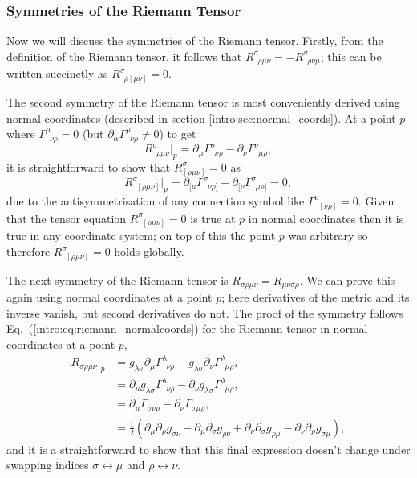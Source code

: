 \subsubsection{Symmetries of the Riemann Tensor}
Now we will discuss the symmetries of the Riemann tensor. Firstly, from the definition of the Riemann tensor, it follows that $R^\sigma_{\,\,\,\rho \mu\nu} = -R^\sigma_{\,\,\,\rho\nu\mu}$; this can be written succinctly as $R^\sigma_{\,\,\,\rho[\mu\nu]}=0$.

The second symmetry of the Riemann tensor is most conveniently derived using normal coordinates (described in section \ref{intro:sec:normal_coords}). At a point $p$ where $\Gamma^\mu_{\,\,\,\nu\rho}=0$ (but $\partial_\alpha \Gamma^\mu_{\,\,\,\nu\rho}\neq 0$) to get
\begin{equation}
R^\sigma_{\,\,\,\rho\mu\nu}\big|_{p} = \partial_\mu \Gamma^\sigma_{\,\,\,\nu\rho}  - \partial_\nu \Gamma^\sigma_{\,\,\,\mu\rho}, \label{intro:eq:riemann_normalcoords}
\end{equation}
it is straightforward to show that $R^\sigma_{[\rho\mu\nu]}=0$ as
\begin{equation}
R^\sigma_{\,\,\,[\rho\mu\nu]}\big|_{p} = \partial_{[\mu} \Gamma^\sigma_{\,\,\,\nu\rho]}  - \partial_{[\nu} \Gamma^\sigma_{\,\,\,\mu\rho]}=0,
\end{equation}
due to the antisymmetrisation of any connection symbol like $\Gamma^\sigma_{\,\,\,[\nu\rho]}=0$. Given that the tensor equation $R^\sigma_{\,\,\,[\rho\mu\nu]}=0$ is true at $p$ in normal coordinates then it is true in any coordinate system; on top of this the point $p$ was arbitrary so therefore $R^\sigma_{\,\,\,[\rho\mu\nu]}=0$ holds globally.

The next symmetry of the Riemann tensor is $R_{\sigma\rho\mu\nu} = R_{\mu\nu\sigma\rho}$. We can prove this again using normal coordinates at a point $p$; here derivatives of the metric and its inverse vanish, but second derivatives do not. The proof of the symmetry follows Eq.~(\ref{intro:eq:riemann_normalcoords}) for the Riemann tensor in normal coordinates at a point $p$,
\begin{align}
R_{\sigma\rho\mu\nu}\big|_p &= g_{\lambda\sigma}\partial_\mu \Gamma^\lambda_{\,\,\,\nu\rho}  - g_{\lambda\sigma}\partial_\nu \Gamma^\lambda_{\,\,\,\mu\rho} , \\
&= \partial_\mu g_{\lambda\sigma} \Gamma^\lambda_{\,\,\,\nu\rho}  - \partial_\nu g_{\lambda\sigma} \Gamma^\lambda_{\,\,\,\mu\rho} , \\
&= \partial_\mu \Gamma_{\sigma\nu\rho}  - \partial_\nu  \Gamma_{\sigma\mu\rho} , \\
&= \frac{1}{2}\left(\partial_{\mu} \partial_\rho g_{\sigma\nu} - \partial_{\mu} \partial_\sigma g_{\rho\nu} + \partial_{\nu} \partial_\sigma g_{\rho\mu} - \partial_{\nu} \partial_\rho g_{\sigma\mu}\right),
\end{align}
and it is a straightforward to show that this final expression doesn't change under swapping indices $\sigma\leftrightarrow\mu$ and $\rho\leftrightarrow\nu$.


